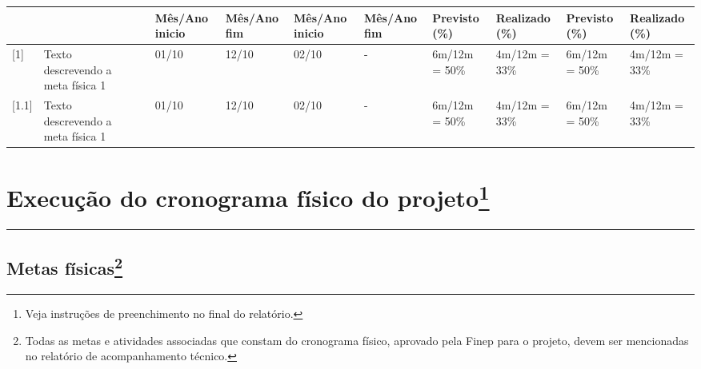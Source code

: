 \documentclass[a4paper,12pt]{article}
\begin{document}
\begin{landscape}
\begin{table}[h]
\begin{tabular}{|p{1cm}|p{3cm}|p{4cm}|p{3cm}|p{1cm}|p{1cm}|p{1cm}|p{1cm}|p{1.5cm}|p{1.5cm}|p{1.5cm}|p{1.5cm}|}
    \rowcolor{lightgray}
    & & & & 
    \textbf{Mês/Ano inicio} & \textbf{Mês/Ano fim} &
    \textbf{Mês/Ano inicio} & \textbf{Mês/Ano fim} &
    \textbf{Previsto (\%)} & \textbf{Realizado (\%)} & \textbf{Previsto (\%)} & \textbf{Realizado (\%)} 
    \\ \hline


    [1] & 
    Texto descrevendo a meta física 1 
    &
    &
    & 01/10 
    & 12/10 
    & 02/10 
    & - & 
    6m/12m = 50\% & 
    4m/12m = 33\% & 
    6m/12m = 50\% &
    4m/12m = 33\% \\
    \hline

    [1.1] & 
    Texto descrevendo a meta física 1 
    &
    &
    & 01/10 
    & 12/10 
    & 02/10 
    & - & 
    6m/12m = 50\% & 
    4m/12m = 33\% & 
    6m/12m = 50\% &
    4m/12m = 33\% \\
    \hline 
\end{tabular}\end{table}
 

\end{landscape}
\restoregeometry %
\newpage


\section
[\texorpdfstring{Execução do cronograma físico do projeto}{Execução do cronograma físico do projeto}]
{Execução do cronograma físico do projeto\protect\footnote{Veja instruções de preenchimento no final do relatório.}}



\vspace{-0.8cm} %
    \rule{\textwidth}{2pt} %
\subsection
[\texorpdfstring{Metas físicas}{Metas físicas}]
{Metas físicas\protect\footnote{Todas as metas e atividades associadas que constam do cronograma físico, aprovado pela Finep para o projeto, devem ser mencionadas no relatório de acompanhamento técnico.}}
\end{document}
